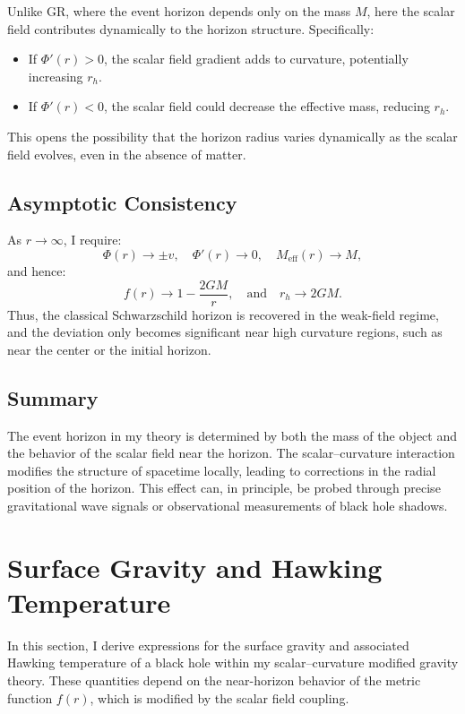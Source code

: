 \documentclass[12pt]{article}
\begin{document}
Unlike GR, where the event horizon depends only on the mass \( M \), here the scalar field contributes dynamically to the horizon structure. Specifically:
\begin{itemize}
    \item If \( \Phi'(r) > 0 \), the scalar field gradient adds to curvature, potentially increasing \( r_h \).
    \item If \( \Phi'(r) < 0 \), the scalar field could decrease the effective mass, reducing \( r_h \).
\end{itemize}

This opens the possibility that the horizon radius varies dynamically as the scalar field evolves, even in the absence of matter.

\subsection{Asymptotic Consistency}

As \( r \to \infty \), I require:
\[
\Phi(r) \to \pm v, \quad \Phi'(r) \to 0, \quad M_{\text{eff}}(r) \to M,
\]
and hence:
\[
f(r) \to 1 - \frac{2GM}{r}, \quad \text{and} \quad r_h \to 2GM.
\]
Thus, the classical Schwarzschild horizon is recovered in the weak-field regime, and the deviation only becomes significant near high curvature regions, such as near the center or the initial horizon.

\subsection{Summary}

The event horizon in my theory is determined by both the mass of the object and the behavior of the scalar field near the horizon. The scalar–curvature interaction modifies the structure of spacetime locally, leading to corrections in the radial position of the horizon. This effect can, in principle, be probed through precise gravitational wave signals or observational measurements of black hole shadows.

\section{Surface Gravity and Hawking Temperature}

In this section, I derive expressions for the surface gravity and associated Hawking temperature of a black hole within my scalar--curvature modified gravity theory. These quantities depend on the near-horizon behavior of the metric function \( f(r) \), which is modified by the scalar field coupling.
\end{document}
